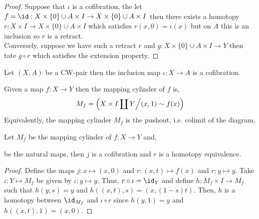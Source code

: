 \documentclass[12pt]{extarticle}
\begin{document}
\begin{proof}
Suppose that $\iota$ is a cofibration, the let $f = \id : X \times \{0\} \cup A \times I \to  X \times \{0\} \cup A \times I$ then there exists a homotopy $r : X \times I \to X \times \{0\} \cup A \times I$ which satisfies $r(x, 0) = \iota(x)$ but on $A$ this is an inclusion so $r$ is a retract. \bigskip \\
Conversely, suppose we have such a retract $r$ and $g :  X \times \{0\} \cup A \times I \to Y$ then tate $ g \circ r$ which satisfies the extension property.  
\end{proof}

\begin{corollary}
Let $(X, A)$ be a CW-pair then the inclusion map $\iota : X \to A$ is a cofibration. 
\end{corollary}

\begin{definition}
Given a map $f : X \to Y$ then the mapping cylinder of $f$ is, 
\[M_f = \left(X \times I \coprod Y \middle/ (x, 1) \sim f(x) \right)\] 
Equivalently, the mapping cylinder $M_f$ is the pushout, i.e. colimit of the diagram,
\begin{center}
\end{center}
\end{definition}

\begin{lemma}
Let $M_f$ be the mapping cylinder of $f : X \to Y$ and,
\begin{center}
\end{center}
be the natural maps, then $j$ is a cofibration and $r$ is a homotopy equivalence.
\end{lemma}

\begin{proof}
Define the maps $j : x \mapsto (x, 0)$ and $r : (x, t) \mapsto f(x)$ and $r : y \mapsto y$. Take $\iota : Y \mapsto M_f$ be given by $\iota : y \mapsto y$. Thus, $r \circ \iota = \id_{Y}$ and define $h : M_f \times I \to M_f$ such that $h(y, s) = y$ and $h((x, t), s) = (x, (1 - s)t )$. Then, $h$ is a homotopy between $\id_{M_f}$ and $\iota \circ r$ since $h(y, 1) = y$ and $h((x, t), 1) = (x, 0)$.  
\end{proof}
\end{document}
